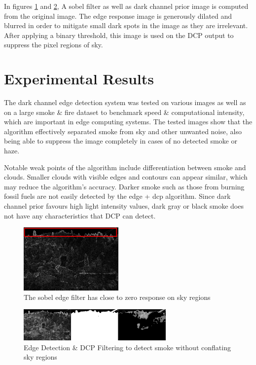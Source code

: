 \documentclass[lettersize,journal]{IEEEtran}
\begin{document}
In figures \ref{sobelsky} and \ref{edgedcp}, A sobel filter as well as dark
channel prior image is computed from the original image. The edge
response image is generously dilated and blurred in order to mitigate
small dark spots in the image as they are irrelevant. After applying a
binary threshold, this image is used on the DCP output to suppress the
pixel regions of sky.

\section{Experimental Results}

The dark channel edge detection system was tested on various images as
well as on a large smoke \& fire dataset to benchmark speed \&
computational intensity, which are important in edge computing systems.
The tested images show that the algorithm effectively separated smoke
from sky and other unwanted noise, also being able to suppress the image
completely in cases of no detected smoke or haze.

Notable weak points of the algorithm include differentiation between
smoke and clouds. Smaller clouds with visible edges and contours can
appear similar, which may reduce the algorithm's accuracy. Darker smoke
such as those from burning fossil fuels are not easily detected by the
edge + dcp algorithm. Since dark channel prior favours high light
intensity values, dark gray or black smoke does not have any
characteristics that DCP can detect.

\begin{figure}
        \centering
        \includegraphics[width=2in]{sobelsky.png}
        \caption{The sobel edge filter has close to zero response on sky
        regions}
        \label{sobelsky}
\end{figure}

\begin{figure}
        \centering
        \includegraphics[width=3in]{edgedcp.png}
        \caption{Edge Detection \& DCP Filtering to detect smoke without
        conflating sky regions}
        \label{edgedcp}
\end{figure}





\newpage


\vfill
\end{document}
